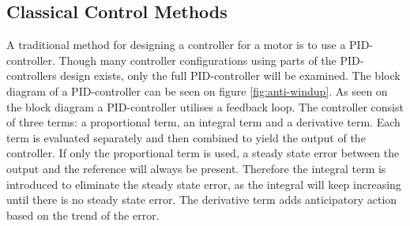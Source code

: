 \documentclass[../../main.tex]{subfiles}
\begin{document}
\subsection*{Classical Control Methods}\label{subsec:classic_control}


A traditional method for designing a controller for a motor is to use a PID-controller. Though many controller configurations using parts of the PID-controllers design exists, only the full PID-controller will be examined. The block diagram of a PID-controller can be seen on figure \ref{fig:anti-windup}. As seen on the block diagram
a PID-controller utilises a feedback loop. The controller consist of three terms: a proportional term, an integral term and a derivative term. Each term is evaluated separately and then combined to yield the output of the controller. If only the proportional term is used, a steady state error between the output and the reference will always be present. Therefore the integral term is introduced to eliminate the steady state error, as the integral will keep increasing until there is no steady state error. The derivative term adds anticipatory action based on the trend of the error. \cite{}





\end{document}
